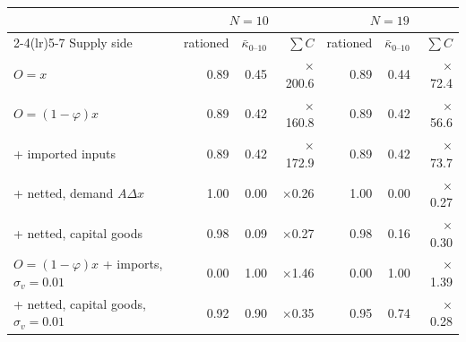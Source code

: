 \begin{tabular}{lrrrrrr}
\toprule
 & \multicolumn{3}{c}{\(N=10\)} & \multicolumn{3}{c}{\(N=19\)} \\
\cmidrule(lr){2-4}\cmidrule(lr){5-7}
Supply side & rationed & \(\bar\kappa_{0\text{--}10}\) & \(\sum C\) & rationed & \(\bar\kappa_{0\text{--}10}\) & \(\sum C\) \\
\midrule
\(O=x\) & 0.89 & 0.45 & \(\times\)200.6 & 0.89 & 0.44 & \(\times\)72.4 \\
\(O=(1-\varphi)x\) & 0.89 & 0.42 & \(\times\)160.8 & 0.89 & 0.42 & \(\times\)56.6 \\
\quad + imported inputs & 0.89 & 0.42 & \(\times\)172.9 & 0.89 & 0.42 & \(\times\)73.7 \\
\quad + netted, demand \(A\Delta x\) & 1.00 & 0.00 & \(\times\)0.26 & 1.00 & 0.00 & \(\times\)0.27 \\
\quad + netted, capital goods & 0.98 & 0.09 & \(\times\)0.27 & 0.98 & 0.16 & \(\times\)0.30 \\
\(O=(1-\varphi)x\) + imports, \(\sigma_v=0.01\) & 0.00 & 1.00 & \(\times\)1.46 & 0.00 & 1.00 & \(\times\)1.39 \\
\quad + netted, capital goods, \(\sigma_v=0.01\) & 0.92 & 0.90 & \(\times\)0.35 & 0.95 & 0.74 & \(\times\)0.28 \\
\bottomrule
\end{tabular}
